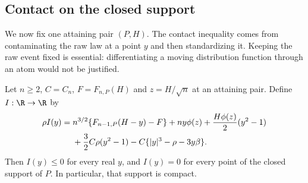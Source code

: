 \subsection{Contact on the closed support}

We now fix one attaining pair $(P,H)$. The contact inequality comes from
contaminating the raw law at a point $y$ and then standardizing it. Keeping
the raw event fixed is essential: differentiating a moving distribution
function through an atom would not be justified.

\begin{lemma}
\label{ms:contact}
Let $n\ge2$, $C=C_n$, $F=F_{n,P}(H)$ and $z=H/\sqrt n$ at an attaining
pair. Define $I:\R\to\R$ by
\begin{align}
 \rho I(y)={}&n^{3/2}\{F_{n-1,P}(H-y)-F\}+ny\phi(z)
   +\frac{H\phi(z)}2(y^2-1)\notag\\
 &+\frac32C\rho(y^2-1)
   -C\{|y|^3-\rho-3y\beta\}.\label{ms:contact-formula}
\end{align}
Then $I(y)\le0$ for every real $y$, and $I(y)=0$ for every point of the
closed support of $P$. In particular, that support is compact.
\end{lemma}
